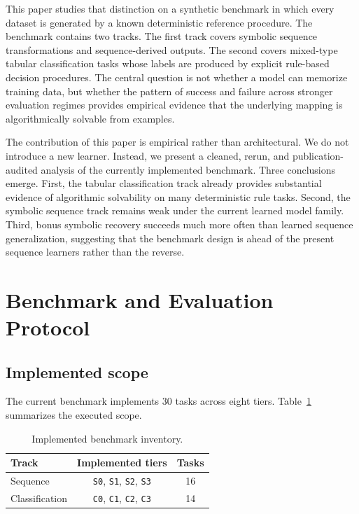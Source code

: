 \documentclass[11pt]{article}
\begin{document}
This paper studies that distinction on a synthetic benchmark in which every dataset is generated by a known deterministic reference procedure. The benchmark contains two tracks. The first track covers symbolic sequence transformations and sequence-derived outputs. The second covers mixed-type tabular classification tasks whose labels are produced by explicit rule-based decision procedures. The central question is not whether a model can memorize training data, but whether the pattern of success and failure across stronger evaluation regimes provides empirical evidence that the underlying mapping is algorithmically solvable from examples.

The contribution of this paper is empirical rather than architectural. We do not introduce a new learner. Instead, we present a cleaned, rerun, and publication-audited analysis of the currently implemented benchmark. Three conclusions emerge. First, the tabular classification track already provides substantial evidence of algorithmic solvability on many deterministic rule tasks. Second, the symbolic sequence track remains weak under the current learned model family. Third, bonus symbolic recovery succeeds much more often than learned sequence generalization, suggesting that the benchmark design is ahead of the present sequence learners rather than the reverse.

\section{Benchmark and Evaluation Protocol}

\subsection{Implemented scope}

The current benchmark implements 30 tasks across eight tiers. Table~\ref{tab:inventory} summarizes the executed scope.

\begin{table}[H]
\centering
\caption{Implemented benchmark inventory.}
\label{tab:inventory}
\begin{tabular}{lcc}
\toprule
Track & Implemented tiers & Tasks \\
\midrule
Sequence & \texttt{S0}, \texttt{S1}, \texttt{S2}, \texttt{S3} & 16 \\
Classification & \texttt{C0}, \texttt{C1}, \texttt{C2}, \texttt{C3} & 14 \\
\bottomrule
\end{tabular}
\end{table}
\end{document}
